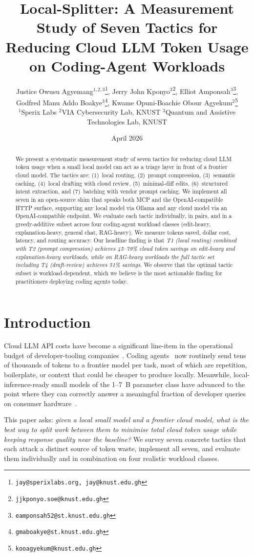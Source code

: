 \documentclass[11pt,a4paper]{article}
\title{%
  Local-Splitter: A Measurement Study of Seven Tactics for Reducing
  Cloud LLM Token Usage on Coding-Agent Workloads
}
\author{%
Justice Owusu Agyemang$^{1,2,3}$\thanks{\texttt{jay@sperixlabs.org, jay@knust.edu.gh}},\quad
Jerry John Kponyo$^{3}$\thanks{\texttt{jjkponyo.soe@knust.edu.gh}},\quad
Elliot Amponsah$^{3}$\thanks{\texttt{eamponsah52@st.knust.edu.gh}},\\
Godfred Manu Addo Boakye$^{3}$\thanks{\texttt{gmaboakye@st.knust.edu.gh}},\quad
Kwame Opuni-Boachie Obour Agyekum$^{2}$\thanks{\texttt{kooagyekum@knust.edu.gh}}\\[4pt]
{\small $^1$Sperix Labs \qquad $^2$VIA Cybersecurity Lab, KNUST \qquad $^3$Quantum and Assistive Technologies Lab, KNUST}%
}
\date{April 2026}
\begin{document}
\maketitle

\begin{abstract}
We present a systematic measurement study of seven tactics for
reducing cloud LLM token usage when a small local model can act as a
triage layer in front of a frontier cloud model. The tactics are:
(1)~local routing, (2)~prompt compression, (3)~semantic caching,
(4)~local drafting with cloud review, (5)~minimal-diff edits,
(6)~structured intent extraction, and (7)~batching with vendor prompt
caching. We implement all seven in an open-source shim that speaks
both MCP and the OpenAI-compatible HTTP surface, supporting any local
model via Ollama and any cloud model via an OpenAI-compatible endpoint.
We evaluate each tactic individually, in pairs, and in a greedy-additive
subset across four coding-agent workload classes
(edit-heavy, explanation-heavy, general chat, RAG-heavy). We measure
tokens saved, dollar cost, latency, and routing accuracy. Our headline finding is that \emph{T1 (local routing) combined with
T2 (prompt compression) achieves 45--79\% cloud token savings on
edit-heavy and explanation-heavy workloads, while on RAG-heavy
workloads the full tactic set including T4 (draft-review) achieves
51\% savings.} We observe that the optimal tactic
subset is workload-dependent, which we believe is the most
actionable finding for practitioners deploying coding agents today.
\end{abstract}

\section{Introduction}
\label{sec:intro}

Cloud LLM API costs have become a significant line-item in the
operational budget of developer-tooling companies~\cite{frugalgpt}.
Coding agents~\cite{swebench,liu2024agents} now routinely send tens
of thousands of tokens to a frontier model per task, most of which are
repetition, boilerplate, or context that could be cheaper to produce
locally. Meanwhile, local-inference-ready small models of the 1--7~B
parameter class have advanced to the point where they can correctly
answer a meaningful fraction of developer queries on consumer
hardware~\cite{llama3,slm-survey,phi3}.

This paper asks: \emph{given a local small model and a frontier cloud
model, what is the best way to split work between them to minimise
total cloud token usage while keeping response quality near the
baseline?} We survey seven concrete tactics that each attack a
distinct source of token waste, implement all seven, and evaluate
them individually and in combination on four realistic workload
classes.
\end{document}
